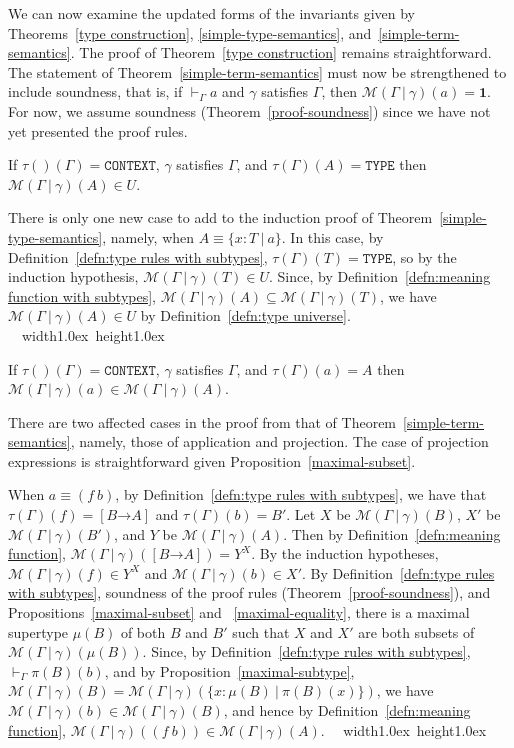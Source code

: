 \documentclass [12pt,twoside]{cslreport}
\newcommand{\thmbox}
   {{\ \hfill\hbox{%
      \vrule width1.0ex height1.0ex
   }\parfillskip 0pt }}
\newenvironment{proof}{{\bf Proof. }}{\thmbox}
\newcommand{\aro}{\mathord\rightarrow} %
\newcommand{\funtype}[2]{[#1 \aro #2]}
\newcommand{\tauGamma}[1]{\tau(\Gamma)(#1)}
\newcommand{\Mgamma}[1]{{\mathcal M}(\Gamma\vbar\gamma)(#1)}
\newcommand{\oneb}{\mathbf{1}}
\newcommand{\tttype}{\mathtt{TYPE}}
\newcommand{\ttcontext}{\mathtt{CONTEXT}}
\newcommand{\vbar}{\ |\ }
\begin{document}
We can now examine the updated forms of the invariants given by
Theorems~\ref{type construction},
\ref{simple-type-semantics},
and~\ref{simple-term-semantics}\@.  
The proof of Theorem~\ref{type construction} remains straightforward.
  The statement of
Theorem~\ref{simple-term-semantics} must now
be strengthened to include soundness, that is, if $\vdash_\Gamma a$
and $\gamma$ satisfies $\Gamma$, then 
$\Mgamma{a} = \oneb$\@.  For now, we assume soundness
(Theorem~\ref{proof-soundness})  since we
have not yet presented the proof rules.  
%
\begin{theorem}
\label{subtype-type-semantics}
If $\tau()(\Gamma) = \ttcontext$, $\gamma$ satisfies $\Gamma$, and
$\tauGamma{A} = \tttype$ then $\Mgamma{A}\in U$.
\end{theorem}
\begin{proof}
There is only one new case to add to the induction proof of
Theorem~\ref{simple-type-semantics}, namely, when 
 $A\equiv \{x : T \vbar a\}$.   In this case, by
Definition~\ref{defn:type rules with subtypes},
$\tauGamma{T} = \tttype$, so by the induction hypothesis,
$\Mgamma{T} \in U$.  Since, by
Definition~\ref{defn:meaning function with subtypes}, $\Mgamma{A} \subseteq
\Mgamma{T}$, we have $\Mgamma{A}\in U$ by
Definition~\ref{defn:type universe}\@.
\end{proof}
\begin{theorem}\label{subtype-term-semantics}
If $\tau()(\Gamma) = \ttcontext$, $\gamma$ satisfies $\Gamma$, and $\tauGamma{a} = A$ then $\Mgamma{a} \in
\Mgamma{A}$\@.  
\end{theorem}
\begin{proof}  There are two affected cases in the proof from that of
Theorem~\ref{simple-term-semantics}, namely, those of application
and projection.  The case of projection expressions is straightforward
given Proposition~\ref{maximal-subset}.

When 
 $a \equiv (f\ b)$, by Definition~\ref{defn:type rules with subtypes},
we have that $\tauGamma{f} = \funtype{B}{A}$ and $\tauGamma{b} = B'$.
Let $X$ be $\Mgamma{B}$, $X'$ be $\Mgamma{B'}$,  and $Y$ be $\Mgamma{A}$.
Then by Definition~\ref{defn:meaning function}, $\Mgamma{\funtype{B}{A}} =
Y^X$\@.  By the induction hypotheses, $\Mgamma{f}\in Y^X$ and
$\Mgamma{b}\in X'$\@.  
By Definition~\ref{defn:type rules with subtypes},
soundness of the proof rules (Theorem~\ref{proof-soundness}), and
Propositions~\ref{maximal-subset} and 
~\ref{maximal-equality}, there is a 
maximal supertype $\mu(B)$ of both $B$ and $B'$ such that $X$ and $X'$
are both subsets of $\Mgamma{\mu(B)}$\@.  Since, by
Definition~\ref{defn:type rules with subtypes}, $\vdash_\Gamma{}\pi(B)(b)$,
and by Proposition~\ref{maximal-subtype}, $\Mgamma{B} =
\Mgamma{\{x : \mu(B)\vbar \pi(B)(x)\}}$, we have $\Mgamma{b}\in
\Mgamma{B}$, and hence by Definition~\ref{defn:meaning function}, $\Mgamma{(f\
b)}\in  \Mgamma{A}$\@.  
\end{proof}
\end{document}
